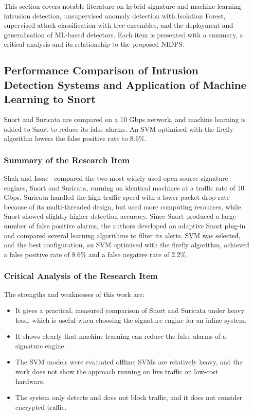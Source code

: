 \noindent This section covers notable literature on hybrid signature and machine learning intrusion detection, unsupervised anomaly detection with Isolation Forest, supervised attack classification with tree ensembles, and the deployment and generalisation of ML-based detectors. Each item is presented with a summary, a critical analysis and its relationship to the proposed NIDPS.

\subsection{Performance Comparison of Intrusion Detection Systems and Application of Machine Learning to Snort}\label{sec:3.2.1}

\noindent Snort and Suricata are compared on a 10 Gbps network, and machine learning is added to Snort to reduce its false alarms. An SVM optimised with the firefly algorithm lowers the false positive rate to 8.6\%.

\subsubsection{Summary of the Research Item}\label{sec:3.2.1.1}

\noindent Shah and Issac~\cite{lr:shah2018} compared the two most widely used open-source signature engines, Snort and Suricata, running on identical machines at a traffic rate of 10 Gbps. Suricata handled the high traffic speed with a lower packet drop rate because of its multi-threaded design, but used more computing resources, while Snort showed slightly higher detection accuracy. Since Snort produced a large number of false positive alarms, the authors developed an adaptive Snort plug-in and compared several learning algorithms to filter its alerts. SVM was selected, and the best configuration, an SVM optimised with the firefly algorithm, achieved a false positive rate of 8.6\% and a false negative rate of 2.2\%.

\subsubsection{Critical Analysis of the Research Item}\label{sec:3.2.1.2}

\noindent The strengths and weaknesses of this work are:

\begin{itemize}
\item It gives a practical, measured comparison of Snort and Suricata under heavy load, which is useful when choosing the signature engine for an inline system.
\item It shows clearly that machine learning can reduce the false alarms of a signature engine.
\item The SVM models were evaluated offline; SVMs are relatively heavy, and the work does not show the approach running on live traffic on low-cost hardware.
\item The system only detects and does not block traffic, and it does not consider encrypted traffic.
\end{itemize}

